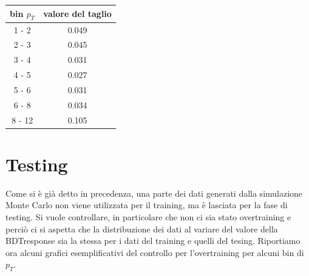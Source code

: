     \begin{table}[H]
		\centering
		\begin{tabular}{c|c}
		    \toprule
		    bin $p_T$   &   valore del taglio  \\
            \midrule
            1 - 2  	&    0.049   \\ 
            2 - 3 	&    0.045  \\ 
            3 - 4  	&    0.031  \\ 
            4 - 5  	&    0.027  \\ 
            5 - 6  	&    0.031  \\ 
            6 - 8  	&    0.034  \\ 
            8 - 12  &    0.105  \\   
			\bottomrule
		\end{tabular}
	\end{table}

 \section{Testing} \label{testing}
 Come si è già detto in precedenza, una parte dei dati generati dalla simulazione Monte Carlo non viene utilizzata per il training, ma è lasciata per la fase di testing. Si vuole controllare, in particolare che non ci sia stato overtraining e perciò ci si aspetta che la distribuzione dei dati al variare del valore della BDTresponse sia la stessa per i dati del training e quelli del tesing. Riportiamo ora alcuni grafici esemplificativi del controllo per l'overtraining per alcuni bin di $p_T$.
 
